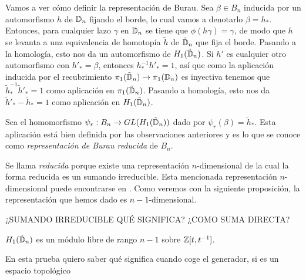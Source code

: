 \documentclass[TFG.tex]{subfiles}
\begin{document}
Vamos a ver cómo definir la representación de Burau. Sea $\beta\in B_n$ inducida por un automorfismo $h$ de $\mathbb{D}_n$ fijando el borde, lo cual vamos a denotarlo $\beta=h_*$. Entonces, para cualquier lazo $\gamma$ en $\mathbb{D}_n$ se tiene que $\phi(h\gamma)=\gamma$, de modo que $h$ se levanta a unz equivalencia de homotopía \cite{Hatcher} $\tilde{h}$ de $\tilde{\mathbb{D}}_n$ que fija el borde. Pasando a la homología, esto nos da un automorfismo de $H_1(\tilde{\mathbb{D}}_n)$. Si $h'$ es cualquier otro automorfismo con $h'_*=\beta$, entonces $h_*^{-1}h'_*=1$, así que como la aplicación inducida por el recubrimiento $\pi_1(\tilde{\mathbb{D}}_n)\to\pi_1(\mathbb{D}_n)$ es inyectiva \cite{Hatcher} tenemos que $\tilde{h}_*^{-1}\tilde{h}'_*=1$ como aplicación en $\pi_1(\tilde{\mathbb{D}}_n)$. Pasando a homología, esto nos da $\tilde{h}'_*-\tilde{h}_*=1$ como aplicación en $H_1(\tilde{\mathbb{D}}_n)$. 




\begin{defi}
Sea el homomorfismo $\psi_r:B_n\to GL(H_1(\tilde{\mathbb{D}}_n))$ dado por $\psi_r(\beta)=\tilde{h}_*$. Esta aplicación está bien definida por las observaciones anteriores y es lo que se conoce como \emph{representación de Burau reducida} de $B_n$.
\end{defi}

Se llama \emph{reducida} porque existe una representación $n$-dimensional de la cual la forma reducida es un sumando irreducible. Esta mencionada representación $n$-dimensional puede encontrarse en \cite{thesis}. Como veremos con la siguiente proposición, la representación que hemos dado es $n-1$-dimensional.

¿SUMANDO IRREDUCIBLE QUÉ SIGNIFICA? ¿COMO SUMA DIRECTA?

\begin{prop}
$H_1(\tilde{\mathbb{D}}_n)$ es un módulo libre de rango $n-1$ sobre $\mathbb{Z}[t,t^{-1}]$.
\end{prop}
\begin{dem}
En esta prueba quiero saber qué significa cuando coge el generador, si es un espacio topológico
\end{dem}


\end{document}
